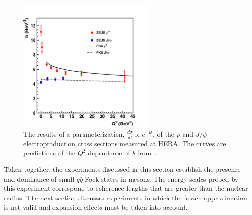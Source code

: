 \begin{figure}[!h]
    \centering
    \includegraphics[width=0.6\textwidth]{chap2/hera.pdf}
    \caption{The results of a parameterization,
             $\frac{d\sigma}{dt}\propto e^{-bt}$, of the $\rho$ and $J/\psi$
             electroproduction cross sections measured at HERA.
             The curves are predictions of the $Q^2$ dependence of $b$
             from~\cite{Frankfurt_1998}.
            }
    \label{fig:hera}
\end{figure}

Taken together, the experiments discussed in this section establish the
presence and dominance of small $q\bar{q}$ Fock states in mesons.
The energy scales probed by this experiment correspond to coherence lengths
that are greater than the nuclear radius.
The next section discusses experiments in which the frozen approximation is not
valid and expansion effects must be taken into account.
